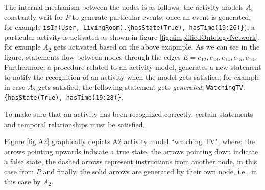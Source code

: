 \documentclass{thesisreport}
\begin{document}
 The internal mechanism between the nodes is as follows: the activity models $A_i$ constantly wait for $P$ to generate particular events, once an event is generated, for example \texttt{isIn(User, LivingRoom).\{hasState(True), hasTime(19:26)\}}), a particular activity is activated as shown in figure \ref{fig:simplifiedOntologyNetwork}, for example $A_2$ gets activated based on the above exapmple. As we can see in the figure, statements flow between nodes through the edges $E = e_{12}, e_{13}, e_{14}, e_{15}, e_{16}$. Furthermore, a procedure related to an activity model, generates a new statement to notify the recognition of an activity when the model gets satisfied, for example in case $A_2$ gets satisfied, the following statement gets \emph{generated}, \texttt{WatchingTV.\{hasState(True), hasTime(19:28)\}}.
 
     
 To make sure that an activity has been recognized correctly, certain statements and temporal relationships must be satisfied.
 
 Figure \ref{fig:A2} graphically depicts A2 activity model ``watching TV", where: the arrows pointing upwards indicate a true state, the arrows pointing down indicate a false state, the dashed arrows represent instructions from another node, in this case from $P$ and finally, the solid arrows are generated by their own node, i.e., in this case by $A_2$.
 
\end{document}
